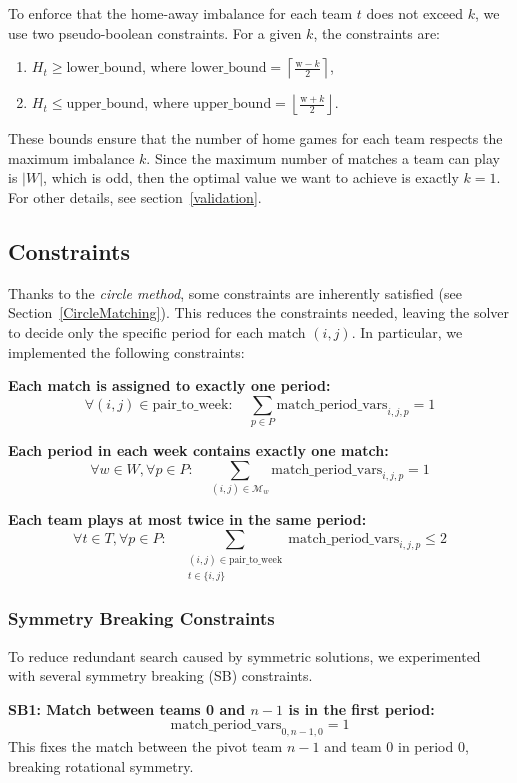 To enforce that the home-away imbalance for each team $t$ does not exceed $k$, we use two pseudo-boolean constraints. For a given $k$, the constraints are:
\begin{enumerate}
    \item $H_t \ge \text{lower\_bound}$, where $\text{lower\_bound} = \left\lceil \frac{\text{w} - k}{2} \right\rceil$,
    \item $H_t \le \text{upper\_bound}$, where $\text{upper\_bound} = \left\lfloor \frac{\text{w} + k}{2} \right\rfloor$.
\end{enumerate}
These bounds ensure that the number of home games for each team respects the maximum imbalance $k$. Since the maximum number of matches a team can play is $|W|$, which is odd, then the optimal value we want to achieve is exactly $k=1$. For other details, see section~\ref{validation}.


\subsection{Constraints}
Thanks to the \emph{circle method}, some constraints are inherently satisfied (see Section~\ref{CircleMatching}).
This reduces the constraints needed, leaving the solver to decide only the specific period for each match $(i,j)$. In particular, we implemented the following constraints:

\textbf{Each match is assigned to exactly one period:}
\[
\forall (i,j) \in \text{pair\_to\_week}: \quad \sum_{p \in P} \text{match\_period\_vars}_{i,j,p} = 1
\]

\textbf{Each period in each week contains exactly one match:}
\[
\forall w \in W, \forall p \in P: \quad \sum_{(i,j) \in \mathcal{M}_w} \text{match\_period\_vars}_{i,j,p} = 1
\]

\textbf{Each team plays at most twice in the same period:}
\[
\forall t \in T, \forall p \in P: \quad \sum_{\substack{(i,j) \in \text{pair\_to\_week} \\ t \in \{i,j\}}} \text{match\_period\_vars}_{i,j,p} \leq 2
\]

\subsubsection*{Symmetry Breaking Constraints}
To reduce redundant search caused by symmetric solutions, we experimented with several symmetry breaking (SB) constraints.

\textbf{SB1: Match between teams 0 and $n-1$ is in the first period:}
\[
\text{match\_period\_vars}_{0,n-1,0} = 1
\]
This fixes the match between the pivot team $n-1$ and team 0 in period 0, breaking rotational symmetry.

